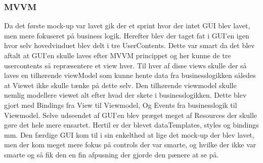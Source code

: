 \subsubsection{MVVM}
Da det første mock-up var lavet gik der et sprint hvor der intet GUI blev lavet, men mere fokuseret
på business logik. Herefter blev der taget fat i GUI'en igen hvor selv hovedvinduet blev delt i tre 
UserContents. Dette var smart da det blev aftalt at GUI'en skulle laves efter MVVM princippet og her kunne
de tre usercontents så repræsentere et view hver. 
Til hver af disse views skulle der så laves en tilhørende viewModel som kunne hente data fra businesslogikken
således at Viewet ikke skulle tænke på dette selv. Den tilhørende viewmodel skulle nemlig modellere viewet alt efter 
hvad der skete i businesslogikken. Dette blev gjort med Bindings fra View til Viewmodel, Og Events fra businesslogik til 
Viewmodel. 
\newline
\newline
Selve udseendet af GUI'en blev præget meget af Resources der skulle gøre det hele mere ensartet. Hertil er der blevet dataTemplates, 
styles og bindings mm.
 \newline
 \newline
Den færdige GUI kom til i sin enkelthed at lige det mock-up der blev lavet, men der kom meget mere fokus på controls der var smarte, og 
hvilke der ikke var smarte og så fik den en fin afpusning der gjorde den pænere at se på.  